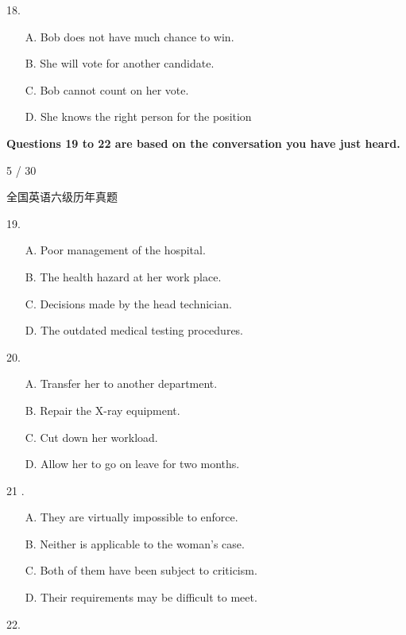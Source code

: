 \documentclass[UTF8,11pt]{ctexart}
\begin{document}
18.


\begin{itemize}[leftmargin=2em,itemsep=.2em,topsep=.4em]\item[A.] Bob does not have much chance to win.
\item[B.] She will vote for another candidate.
\item[C.] Bob cannot count on her vote.
\item[D.] She knows the right person for the position
\end{itemize}

\textbf{Questions 19 to 22 are based on the conversation you have just heard.}


5 / 30


全国英语六级历年真题


19.


\begin{itemize}[leftmargin=2em,itemsep=.2em,topsep=.4em]\item[A.] Poor management of the hospital.
\item[B.] The health hazard at her work place.
\item[C.] Decisions made by the head technician.
\item[D.] The outdated medical testing procedures.
\end{itemize}

20.


\begin{itemize}[leftmargin=2em,itemsep=.2em,topsep=.4em]\item[A.] Transfer her to another department.
\item[B.] Repair the X-ray equipment.
\item[C.] Cut down her workload.
\item[D.] Allow her to go on leave for two months.
\end{itemize}

21 .


\begin{itemize}[leftmargin=2em,itemsep=.2em,topsep=.4em]\item[A.] They are virtually impossible to enforce.
\item[B.] Neither is applicable to the woman's case.
\item[C.] Both of them have been subject to criticism.
\item[D.] Their requirements may be difficult to meet.
\end{itemize}

22.
\end{document}

